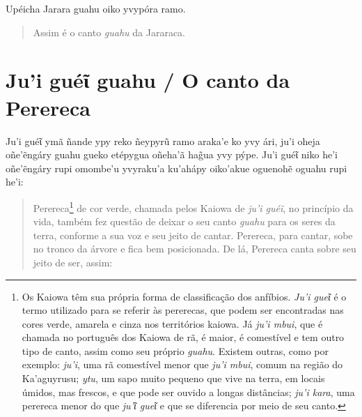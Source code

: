 \begin{itemize}
Upéicha Jarara guahu oiko yvypóra ramo.

\begin{quote}
Assim é o canto \emph{guahu} da Jararaca.
\end{quote}

\chapter{Ju'i guéῖ guahu / O canto da Perereca}

Ju'i guéῖ ymã ñande ypy reko ñeypyrũ ramo araka'e ko yvy ári, ju'i oheja
oñe'ẽngáry guahu gueko etépygua oñeha'ã hag̃ua yvy pýpe. Ju'i guéῖ niko
he'i oñe'ẽngáry rupi omombe'u yvyraku'a ku'ahápy oiko'akue oguenohẽ
oguahu rupi he'i:

\begin{quote}
Perereca\footnote{Os Kaiowa têm sua própria forma de classificação dos
  anfíbios. \emph{Ju'i gueῖ} é o termo utilizado para se referir às
  pererecas, que podem ser encontradas nas cores verde, amarela e cinza
  nos territórios kaiowa. Já \emph{ju'i mbui}, que é chamada no
  português dos Kaiowa de rã, é maior, é comestível e tem outro tipo de
  canto, assim como seu próprio \emph{guahu}. Existem outras, como por
  exemplo: \emph{ju'i}, uma rã comestível menor que \emph{ju'i mbui},
  comum na região do Ka'aguyrusu; \emph{ytu}, um sapo muito pequeno que
  vive na terra, em locais úmidos, mas frescos, e que pode ser ouvido a
  longas distâncias; \emph{ju'i kara}, uma perereca menor do que
  \emph{ju'ῖ gueῖ} e que se diferencia por meio de seu canto.} de cor
verde, chamada pelos Kaiowa de \emph{ju'i guéĩ}, no princípio da vida,
também fez questão de deixar o seu canto \emph{guahu} para os seres da
terra, conforme a sua voz e seu jeito de cantar. Perereca, para cantar,
sobe no tronco da árvore e fica bem posicionada. De lá, Perereca canta
sobre seu jeito de ser, assim:
\end{quote}


\end{itemize}
